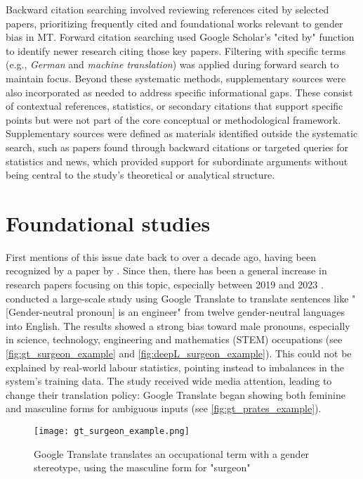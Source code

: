     Backward citation searching involved reviewing references cited by selected papers, prioritizing frequently cited and foundational works relevant to gender bias in MT. Forward citation searching used Google Scholar's "cited by" function to identify newer research citing those key papers. Filtering with specific terms (e.g., \textit{German} and \textit{machine translation}) was applied during forward search to maintain focus. Beyond these systematic methods, supplementary sources were also incorporated as needed to address specific informational gaps. These consist of contextual references, statistics, or secondary citations that support specific points but were not part of the core conceptual or methodological framework. Supplementary sources were defined as materials identified outside the systematic search, such as papers found through backward citations or targeted queries for statistics and news, which provided support for subordinate arguments without being central to the study's theoretical or analytical structure. 

    \section{Foundational studies}
        First mentions of this issue date back to over a decade ago, having been recognized by a paper by \textcite{schiebingerScientificResearchMust2014}. Since then, there has been a general increase in research papers focusing on this topic, especially between 2019 and 2023 \parencite{savoldiDecadeGenderBias2025}. \textcite{pratesAssessingGenderBias2019} conducted a large-scale study using Google Translate to translate sentences like "[Gender-neutral pronoun] is an engineer" from twelve gender-neutral languages into English. The results showed a strong bias toward male pronouns, especially in science, technology, engineering and mathematics (STEM) occupations (see \autoref{fig:gt_surgeon_example} and \ref{fig:deepL_surgeon_example}). This could not be explained by real-world labour statistics, pointing instead to imbalances in the system's training data. The study received wide media attention, leading \citeauthor{googleReducingGenderBias2018} to change their translation policy: Google Translate began showing both feminine and masculine forms for ambiguous inputs \parencite{googleReducingGenderBias2018} (see \autoref{fig:gt_prates_example}). 

        \vspace{0.8em}
        \begin{figure}[htb]
            \centering
            \texttt{[image: gt\_surgeon\_example.png]}
            \caption[Example of Google Translate's biased translation]{Google Translate translates an occupational term with a gender stereotype, using the masculine form for "surgeon"}
            \label{fig:gt_surgeon_example}
        \end{figure}

